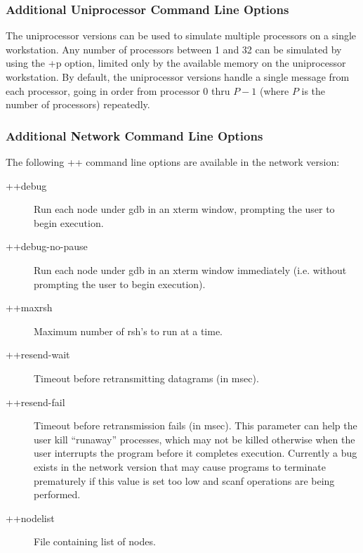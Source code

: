 \subsubsection[Additional Uniprocessor Command Line Options]
{Additional Uniprocessor Command Line Options}
\label{uniprocessor command line options}

The uniprocessor versions can be used to simulate multiple
processors on a single workstation.  Any number of processors between 1 and 32 can be simulated by
using the {\fexec +p} option, limited only by the available memory on the
uniprocessor workstation.  By default, the uniprocessor versions handle
a single message from each processor, going in order from processor 0
thru $P-1$ (where $P$ is the number of processors) repeatedly.  

\subsubsection[Additional Network Command Line Options]
{Additional Network Command Line Options}
\label{network command line options}

The following {\fexec ++} command line options are available in
the network version:
\begin{description}

\item[{\fexec ++debug}] Run each node under gdb in an xterm window, prompting
the user to begin execution.

\item[{\fexec ++debug-no-pause}] Run each node under gdb in an xterm window
immediately (i.e. without prompting the user to begin execution).

\item[{\fexec ++maxrsh}] Maximum number of {\fcmd rsh}'s to run at a
time.

\item[{\fexec ++resend-wait}] Timeout before retransmitting datagrams
(in msec).

\item[{\fexec ++resend-fail}] Timeout before retransmission fails (in
msec).
This parameter can help the user kill ``runaway'' processes, which may not
be killed otherwise when the user interrupts the program before it 
completes execution.
Currently a bug exists in the network version that may cause programs to
terminate prematurely if this value is set too low and {\fexec scanf} 
operations are being performed.

\item[{\fexec ++nodelist}] File containing list of nodes.

\end{description}

